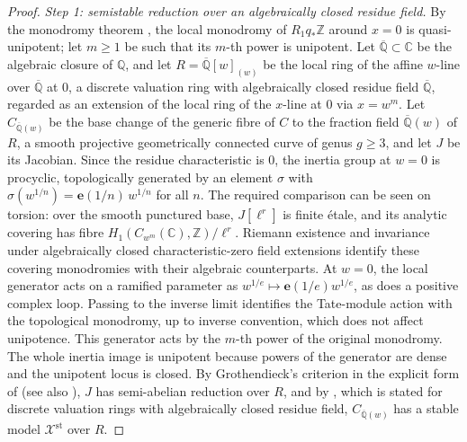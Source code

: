 \documentclass[11pt]{amsart}
\theoremstyle{definition}
\theoremstyle{remark}
\numberwithin{equation}{section}
\newcommand{\Q}{\mathbb{Q}}
\newcommand{\Z}{\mathbb{Z}}
\newcommand{\C}{\mathbb{C}}
\newcommand{\Qb}{\overline{\mathbb{Q}}}
\newcommand{\e}{\mathbf{e}}
\newcommand{\cX}{\mathcal{X}}
\begin{document}
\begin{proof}
\emph{Step 1: semistable reduction over an algebraically closed residue field.} By the monodromy theorem \citep[III.2.3]{Deligne1970}, the local monodromy of $R_1q_*\Z$ around $x=0$ is quasi-unipotent; let $m\ge1$ be such that its $m$-th power is unipotent. Let $\Qb\subset\C$ be the algebraic closure of $\Q$, and let $R=\Qb[w]_{(w)}$ be the local ring of the affine $w$-line over $\Qb$ at $0$, a discrete valuation ring with algebraically closed residue field $\Qb$, regarded as an extension of the local ring of the $x$-line at $0$ via $x=w^m$. Let $C_{\Qb(w)}$ be the base change of the generic fibre of $C$ to the fraction field $\Qb(w)$ of $R$, a smooth projective geometrically connected curve of genus $g\ge3$, and let $J$ be its Jacobian. Since the residue characteristic is $0$, the inertia group at $w=0$ is procyclic, topologically generated by an element $\sigma$ with $\sigma(w^{1/n})=\e(1/n)\,w^{1/n}$ for all $n$. The required comparison can be seen on torsion: over the smooth punctured base, $J[\ell^r]$ is finite étale, and its analytic covering has fibre $H_1(C_{w^m}(\C),\Z)/\ell^r$. Riemann existence and invariance under algebraically closed characteristic-zero field extensions \citep[Remark~3.3(c), Theorem~3.4]{MilneEtale2013} identify these covering monodromies with their algebraic counterparts. At $w=0$, the local generator acts on a ramified parameter as $w^{1/e}\mapsto\e(1/e)w^{1/e}$, as does a positive complex loop. Passing to the inverse limit identifies the Tate-module action with the topological monodromy, up to inverse convention, which does not affect unipotence. This generator acts by the $m$-th power of the original monodromy. The whole inertia image is unipotent because powers of the generator are dense and the unipotent locus is closed. By Grothendieck's criterion in the explicit form of \citet[Theorem~4.1]{SilverbergZarhin2001} (see also \citep[Exposé~IX, Proposition~3.5 and Corollary~3.8]{SGA7I}), $J$ has semi-abelian reduction over $R$, and by \citet[Theorem~2.4]{DeligneMumford1969}, which is stated for discrete valuation rings with algebraically closed residue field, $C_{\Qb(w)}$ has a stable model $\cX^{\mathrm{st}}$ over $R$.


\end{proof}
\end{document}
